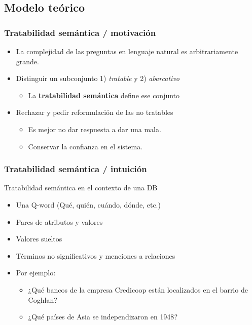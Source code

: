 \subsection{Modelo teórico}


\begin{frame}[<+->]
  \frametitle{Tratabilidad semántica / motivación}
      \begin{itemize}
          \item La complejidad de las preguntas en lenguaje natural es arbitrariamente grande.
          \item Distinguir un subconjunto 1) \textit{tratable} y 2) \textit{abarcativo}
          \begin{itemize}
            \item La {\color{blue}\textbf{tratabilidad semántica}} define ese conjunto
          \end{itemize}
          \item Rechazar y pedir reformulación de las no tratables
          \begin{itemize}
            \item Es mejor no dar respuesta a dar una mala. 
            \item Conservar la confianza en el sistema.
          \end{itemize}
      \end{itemize}
\end{frame}

\begin{frame}[<+->]
  \frametitle{Tratabilidad semántica / intuición}
    \begin{block}{Tratabilidad semántica en el contexto de una DB}
      \begin{itemize}
          \item Una {\color{green}Q-word} (Qué, quién, cuándo, dónde, etc.)
          \item Pares de {\color{blue}atributos} y {\color{blue}valores}
          \item {\color{purple}Valores} sueltos
          \item Términos no significativos y {\color{orange}menciones a relaciones}
          \item Por ejemplo:
            \begin{itemize}
              \item ¿{\color{green}Qué} {\color{orange}bancos} de la {\color{blue}empresa Credicoop} están localizados en el {\color{blue}barrio} de {\color{blue}Coghlan}?
              \item ¿{\color{green}Qué} {\color{orange}países} de {\color{purple}Asia} se {\color{blue}independizaron} en {\color{blue}1948}?
            \end{itemize}
      \end{itemize}
    \end{block}
\end{frame}

